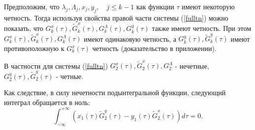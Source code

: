 Предположим, что $\lambda_j,\Lambda_j,x_j,y_j, \quad j \le k-1$ как функции $\tau$ имеют некоторую четность. Тогда используя свойства правой части системы (\ref{fulltn}) можно показать, что $G_k^x(\tau),\tilde G_k^x(\tau),G_k^\Lambda(\tau), G_k^y(\tau)$ также имеют четность. При этом $G_k^x(\tau),\tilde G_k^x(\tau),G_k^\Lambda(\tau)$ имеют одинаковую четность, а $G_k^y(\tau), \tilde G_k^y(\tau)$ имеют противоположную к $G_k^x(\tau)$ четность (доказательство в приложении). 

В частности для системы (\ref{fulltn}) $G_2^x(\tau), \tilde G_2^x(\tau), G_2^\Lambda$ - нечетные, $G_2^y(\tau), \tilde G_2^y(\tau)$ - четные.

Как следствие, в силу нечетности подынтегральной функции, следующий интеграл обращается в ноль:
\begin{equation}
\int_{-\infty}^{+\infty} \left( x_1(\tau) \tilde G_2^y(\tau) - y_1(\tau) \tilde G_2^x(\tau) \right) d \tau = 0.
\label{zeroint}
\end{equation}